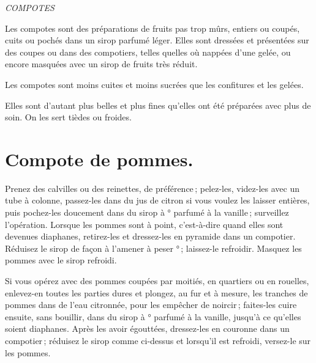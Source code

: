 \sk

\begin{center}
\textit{COMPOTES}
\end{center}

\bigskip


Les compotes sont des préparations de fruits pas trop mûrs, entiers ou coupés,
cuits ou pochés dans un sirop parfumé léger. Elles sont dressées et présentées
sur des coupes ou dans des compotiers, telles quelles où nappées d'une gelée,
ou encore masquées avec un sirop de fruits très réduit.

Les compotes sont moins cuites et moins sucrées que les confitures et les gelées.

Elles sont d'autant plus belles et plus fines qu'elles ont été préparées avec plus de
soin. On les sert tièdes ou froides.

\section*{\centering Compote de pommes.}
{}

Prenez des calvilles ou des reinettes, de préférence ; pelez-les, videz-les
avec un tube à colonne, passez-les dans du jus de citron si vous voulez les
laisser entières, puis pochez-les doucement dans du sirop à {\mmm}°
parfumé à la vanille ; surveillez l'opération. Lorsque les pommes sont à point,
c'est-à-dire quand elles sont devenues diaphanes, retirez-les et dressez-les en
pyramide dans un compotier. Réduisez le sirop de façon à l'amener à peser
{\mmm}° ; laissez-le refroidir. Masquez les pommes avec le sirop
refroidi.

\medskip

Si vous opérez avec des pommes coupées par moitiés, en quartiers ou en
rouelles, enlevez-en toutes les parties dures et plongez, au fur et à mesure,
les tranches de pommes dans de l'eau citronnée, pour les empêcher de noircir ;
faites-les cuire ensuite, sans bouillir, dans du sirop à {\mmm}° parfumé
à la vanille, jusqu'à ce qu'elles soient diaphanes. Après les avoir égouttées,
dressez-les en couronne dans un compotier ; réduisez le sirop comme ci-dessus
et lorsqu'il est refroidi, versez-le sur les pommes.

